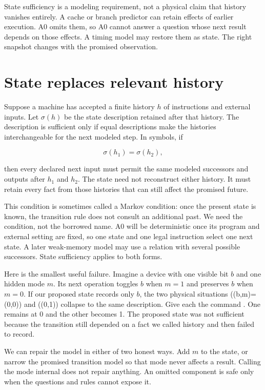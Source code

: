 State sufficiency is a modeling requirement, not a physical claim that
history vanishes entirely.
A cache or branch predictor can retain effects of earlier execution. A0 omits
them, so A0 cannot answer a question whose next result depends on those
effects. A timing model may restore them as state. The right snapshot changes
with the promised observation.

\section{State replaces relevant history}

Suppose a machine has accepted a finite history \(h\) of instructions and
external inputs. Let \(\sigma(h)\) be the state description retained after
that history. The description is sufficient only if equal descriptions make
the histories interchangeable for the next modeled step. In symbols, if

\[
\sigma(h_1)=\sigma(h_2),
\]

then every declared next input must permit the same modeled successors and
outputs after \(h_1\) and \(h_2\). The state need not reconstruct either
history. It must retain every fact from those histories that can still affect
the promised future.

This condition is sometimes called a Markov condition: once the present state
is known, the transition rule does not consult an additional past. We need the
condition, not the borrowed name. A0 will be deterministic once its program
and external setting are fixed, so one state and one legal instruction select
one next state. A later weak-memory model may use a relation with several
possible successors. State sufficiency applies to both forms.

Here is the smallest useful failure. Imagine a device with one visible bit
\(b\) and one hidden mode \(m\). Its next operation toggles \(b\) when \(m=1\)
and preserves \(b\) when \(m=0\). If our proposed state records only \(b\), the
two physical situations ((b,m)=(0,0)) and ((0,1)) collapse to the same
description. Give each the command . One remains at 0 and the other
becomes 1. The proposed state was not sufficient because the transition still
depended on a fact we called history and then failed to record.

We can repair the model in either of two honest ways. Add \(m\) to the state,
or narrow the promised transition model so that mode never affects a result.
Calling the mode internal does not repair anything. An omitted component is
safe only when the questions and rules cannot expose it.

